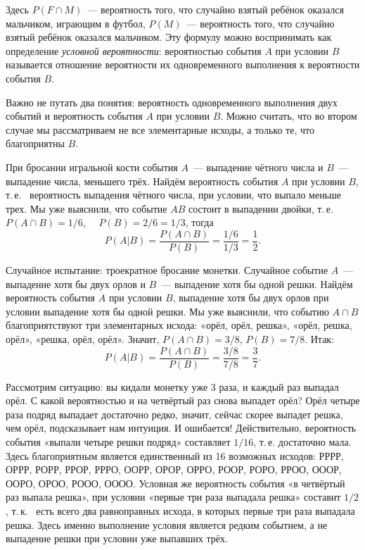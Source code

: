\documentclass[12pt,a4paper]{article}
\begin{document}
Здесь $P(F\cap M)$~--- вероятность того, что случайно взятый ребёнок оказался мальчиком, играющим в футбол, $P(M)$~--- вероятность того, что случайно взятый ребёнок оказался мальчиком. Эту формулу можно воспринимать как определение \emph{условной вероятности}: вероятностью события $A$ при условии $B$ называется отношение вероятности их одновременного выполнения к вероятности события $B$.

Важно не путать два понятия: вероятность одновременного выполнения двух событий и вероятность события $A$ при условии $B$. Можно считать, что во втором случае мы рассматриваем не все элементарные исходы, а только те, что благоприятны $B$.

\begin{example}
	При бросании игральной кости события $A$~--- выпадение чётного числа  и $B$~--- выпадение числа, меньшего трёх. Найдём вероятность события $A$ при условии $B$, т.\,е. ~вероятность выпадения чётного числа, при условии, что выпало меньше трех. Мы уже выяснили, что событие $AB$ состоит в выпадении двойки, т.\,е.~ $P(A\cap B)=1/6$,~~ $P(B)=2/6=1/3$, тогда
	$$
		P(A|B) =\frac{P(A\cap B)}{P(B)}=\frac{1/6}{1/3}=\frac{1}{2}.
	$$
\end{example}
\begin{example}
	Случайное испытание: троекратное бросание монетки. Случайное событие $A$~--- выпадение хотя бы двух орлов и $B$~--- выпадение хотя бы одной решки. Найдём вероятность события $A$ при условии $B$, выпадение хотя бы двух орлов при условии выпадение хотя бы одной решки. Мы уже выяснили, что событию $A\cap B$ благоприятствуют три элементарных исхода: «орёл, орёл, решка», «орёл, решка, орёл», «решка, орёл, орёл». Значит, $P(A\cap B)=3/8$, $P(B)=7/8$. Итак:
	$$
		P(A|B) =\frac{P(A\cap B)}{P(B)}=\frac{3/8}{7/8}=\frac{3}{7}.
	$$
\end{example}

\begin{example}
	Рассмотрим ситуацию: вы кидали монетку уже 3 раза, и каждый раз выпадал орёл. С какой вероятностью и на четвёртый раз снова выпадет орёл? Орёл четыре раза подряд выпадает достаточно редко, значит, сейчас скорее выпадет решка, чем орёл, подсказывает нам интуиция. И ошибается! Действительно, вероятность события «выпали четыре решки подряд» составляет $1/16$, т.\,е. достаточно мала. Здесь благоприятным является единственный из 16 возможных исходов: РРРР, ОРРР, РОРР, РРОР, РРРО, ООРР, ОРОР, ОРРО, РООР, РОРО, РРОО, ОООР, ООРО, ОРОО, РООО, ОООО. Условная же вероятность события «в четвёртый раз выпала решка», при условии «первые три раза выпадала решка»  составит $1/2$, т.\,к. ~есть всего два равноправных исхода, в которых первые три раза выпадала решка. Здесь именно выполнение условия является редким событием, а не выпадение решки при условии уже выпавших трёх.
\end{example}
\end{document}

